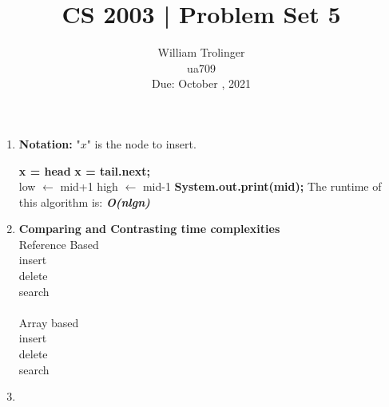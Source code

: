 \documentclass{article}
\begin{document}
\title{CS 2003 | Problem Set 5}
\author{William Trolinger\\
			ua709\\
			Due: October , 2021
			}
\maketitle
\begin{enumerate}
	\item 
\textbf{Notation:} $\textit{"x"}$ is the node to insert.
\begin{algorithm}
	\begin{algorithmic}[1]
		
			\State \textbf{x = head}
			\State \textbf{x = tail.next;}\\
		\EndIf
		\EndIf
			\State low $\leftarrow $ mid+1
			\State high $\leftarrow $ mid-1
		\Else
			\State \textbf{System.out.print(mid);}
		\EndIf
\State The runtime of this algorithm is: \textbf{\textit{O(nlgn)}}
\EndFunction
\end{algorithmic}
\end{algorithm}

\item \textbf{Comparing and Contrasting time complexities}\\
Reference Based \\
insert\\
delete\\
search\\
\\
Array based\\
insert\\
delete\\
search\\

 \item 




\end{enumerate}
\end{document}
